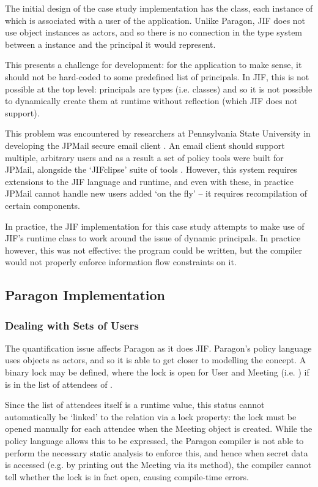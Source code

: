 The initial design of the case study implementation has the  class, each instance of which is associated with a user of the application. Unlike Paragon, JIF does not use object instances as actors, and so there is no connection in the type system between a  instance and the principal it would represent.

This presents a challenge for development: for the application to make sense, it should not be hard-coded to some predefined list of principals. In JIF, this is not possible at the top level: principals are types (i.e. classes) and so it is not possible to dynamically create them at runtime without reflection (which JIF does not support).

This problem was encountered by researchers at Pennsylvania State University in developing the JPMail secure email client \cite{jpmailpage}. An email client should support multiple, arbitrary users and as a result a set of policy tools were built for JPMail, alongside the `JIFclipse' suite of tools \cite{hicks2007jifclipse}. However, this system requires extensions to the JIF language and runtime, and even with these, in practice JPMail cannot handle new users added `on the fly' -- it requires recompilation of certain components.

In practice, the JIF implementation for this case study attempts to make use of JIF's runtime  class to work around the issue of dynamic principals. In practice however, this was not effective: the program could be written, but the compiler would not properly enforce information flow constraints on it.

\subsection{Paragon Implementation}

\subsubsection{Dealing with Sets of Users}

The quantification issue affects Paragon as it does JIF. Paragon's policy language uses objects as actors, and so it is able to get closer to modelling the concept. A binary lock  may be defined, where the lock is open for User  and Meeting  (i.e. ) if  is in the list of attendees of .

Since the list of attendees itself is a runtime value, this status cannot automatically be `linked' to the relation via a lock property: the lock must be opened manually for each attendee when the Meeting object is created. While the policy language allows this to be expressed, the Paragon compiler is not able to perform the necessary static analysis to enforce this, and hence when secret data is accessed (e.g. by printing out the Meeting via its  method), the compiler cannot tell whether the lock is in fact open, causing compile-time errors.

